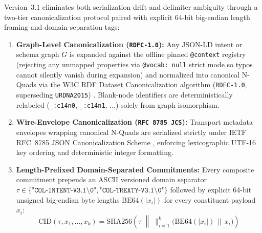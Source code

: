 Version~3.1 eliminates both serialization drift and delimiter ambiguity through a two-tier canonicalization protocol paired with explicit 64-bit big-endian length framing and domain-separation tags:
\begin{enumerate}
    \item \textbf{Graph-Level Canonicalization (\texttt{RDFC-1.0}):} Any JSON-LD intent or schema graph $G$ is expanded against the offline pinned \texttt{@context} registry (rejecting any unmapped properties via \texttt{@vocab: null} strict mode so typos cannot silently vanish during expansion) and normalized into canonical N-Quads via the W3C RDF Dataset Canonicalization algorithm (\texttt{RDFC-1.0}, superseding \texttt{URDNA2015}) \parencite{w3c2024rdfc}. Blank-node identifiers are deterministically relabeled (\texttt{\_:c14n0}, \texttt{\_:c14n1}, $\dots$) solely from graph isomorphism.
    \item \textbf{Wire-Envelope Canonicalization (\texttt{RFC 8785 JCS}):} Transport metadata envelopes wrapping canonical N-Quads are serialized strictly under IETF RFC~8785 JSON Canonicalization Scheme \parencite{rfc8785}, enforcing lexicographic UTF-16 key ordering and deterministic integer formatting.
    \item \textbf{Length-Prefixed Domain-Separated Commitments:} Every composite commitment prepends an ASCII versioned domain separator $\tau \in \{\texttt{"COL-INTENT-V3.1\textbackslash0"}, \texttt{"COL-TREATY-V3.1\textbackslash0"}\}$ followed by explicit 64-bit unsigned big-endian byte lengths $\mathrm{BE64}(|x_i|)$ for every constituent payload $x_i$:
    \begin{equation}
        \mathrm{CID}(\tau, x_1, \dots, x_k) = \mathrm{SHA256}\!\left(\tau \;\middle\|\; \big\|_{i=1}^{k} \bigl(\mathrm{BE64}(|x_i|) \,\|\, x_i\bigr)\right)
        \label{eq:length-prefixed-cid}
    \end{equation}
\end{enumerate}

